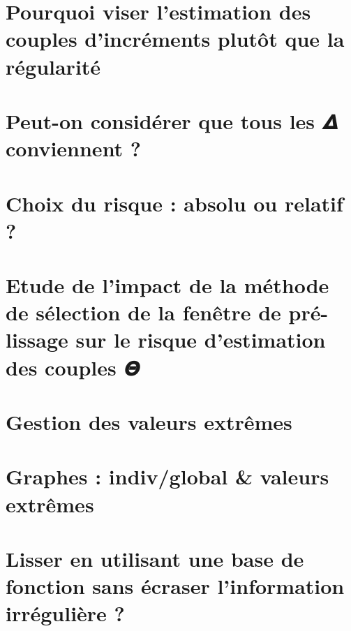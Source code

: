 
\minitoc%

\section{Pourquoi viser l'estimation des couples d'incréments plutôt que la régularité}
\label{annexe:choix_risque_couple}


\section{Peut-on considérer que tous les 𝜟 conviennent ?}
\label{annexe:tous_theta_conviennent_borne_norme_theta}


\section{Choix du risque : absolu ou relatif ?}
\label{annexe:choix-du-rique}


\section{Etude de l'impact de la méthode de sélection de la fenêtre de pré-lissage sur le risque d'estimation des couples 𝜣}




\section{Gestion des valeurs extrêmes}

\section{Graphes : indiv/global \& valeurs extrêmes}
\pagebreak


\section{Lisser en utilisant une base de fonction sans écraser l'information irrégulière ?}
\label{annexe:lissage_base_fcn}


